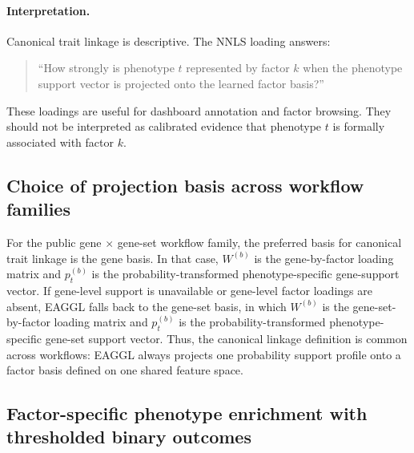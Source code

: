\documentclass[11pt]{article}
\begin{document}
\paragraph{Interpretation.}
Canonical trait linkage is descriptive. The NNLS loading answers:
\begin{quote}
``How strongly is phenotype $t$ represented by factor $k$ when the phenotype support vector is projected onto the learned factor basis?''
\end{quote}
These loadings are useful for dashboard annotation and factor browsing. They should not be interpreted as calibrated evidence that phenotype $t$ is formally associated with factor $k$.

\subsection{Choice of projection basis across workflow families}

For the public gene $\times$ gene-set workflow family, the preferred basis for canonical trait linkage is the gene basis. In that case, $W^{(b)}$ is the gene-by-factor loading matrix and $p_t^{(b)}$ is the probability-transformed phenotype-specific gene-support vector. If gene-level support is unavailable or gene-level factor loadings are absent, EAGGL falls back to the gene-set basis, in which $W^{(b)}$ is the gene-set-by-factor loading matrix and $p_t^{(b)}$ is the probability-transformed phenotype-specific gene-set support vector. Thus, the canonical linkage definition is common across workflows: EAGGL always projects one probability support profile onto a factor basis defined on one shared feature space.

\subsection{Factor-specific phenotype enrichment with thresholded binary outcomes}
\end{document}
